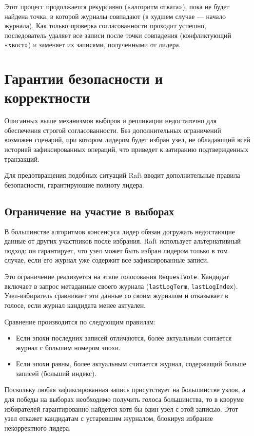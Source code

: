 Этот процесс продолжается рекурсивно («алгоритм отката»), пока не будет найдена точка, в которой журналы совпадают (в худшем случае — начало журнала). Как только проверка согласованности проходит успешно, последователь удаляет все записи после точки совпадения (конфликтующий «хвост») и заменяет их записями, полученными от лидера.

\section{Гарантии безопасности и корректности}

Описанных выше механизмов выборов и репликации недостаточно для обеспечения строгой согласованности. Без дополнительных ограничений возможен сценарий, при котором лидером будет избран узел, не обладающий всей историей зафиксированных операций, что приведет к затиранию подтвержденных транзакций.

Для предотвращения подобных ситуаций Raft вводит дополнительные правила безопасности, гарантирующие полноту лидера.

\subsection{Ограничение на участие в выборах}

В большинстве алгоритмов консенсуса лидер обязан догружать недостающие данные от других участников после избрания. Raft использует альтернативный подход: он гарантирует, что узел может быть избран лидером только в том случае, если его журнал уже содержит все зафиксированные записи.

Это ограничение реализуется на этапе голосования \texttt{RequestVote}. Кандидат включает в запрос метаданные своего журнала (\texttt{lastLogTerm}, \texttt{lastLogIndex}). Узел-избиратель сравнивает эти данные со своим журналом и отказывает в голосе, если журнал кандидата менее актуален.

Сравнение производится по следующим правилам:
\begin{itemize}
    \item Если эпохи последних записей отличаются, более актуальным считается журнал с большим номером эпохи.
    \item Если эпохи равны, более актуальным считается журнал, содержащий больше записей (больший индекс).
\end{itemize}

Поскольку любая зафиксированная запись присутствует на большинстве узлов, а для победы на выборах необходимо получить голоса большинства, то в кворуме избирателей гарантированно найдется хотя бы один узел с этой записью. Этот узел откажет кандидатам с устаревшим журналом, блокируя избрание некорректного лидера.

